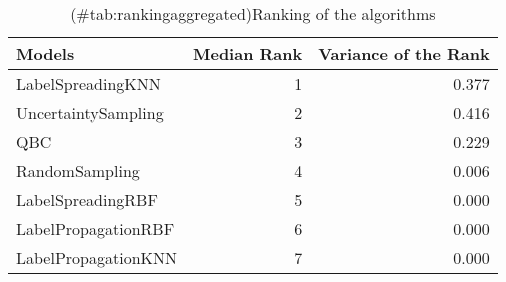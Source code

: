 \begin{table}[!h]

\caption{(\#tab:rankingaggregated)Ranking of the algorithms}
\centering
\begin{tabular}[t]{lrr}
\toprule
Models & Median Rank & Variance of the Rank\\
\midrule
LabelSpreadingKNN & 1 & 0.377\\
UncertaintySampling & 2 & 0.416\\
QBC & 3 & 0.229\\
RandomSampling & 4 & 0.006\\
LabelSpreadingRBF & 5 & 0.000\\
LabelPropagationRBF & 6 & 0.000\\
LabelPropagationKNN & 7 & 0.000\\
\bottomrule
\end{tabular}
\end{table}
